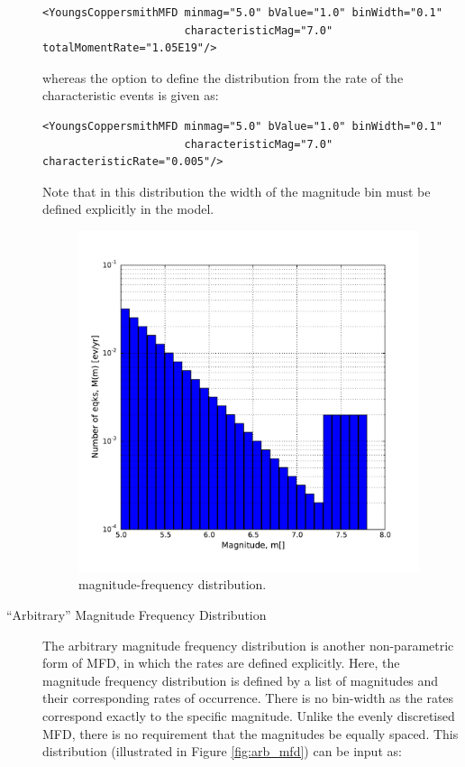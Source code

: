 \begin{description}
\begin{verbatim}
<YoungsCoppersmithMFD minmag="5.0" bValue="1.0" binWidth="0.1"
                      characteristicMag="7.0" totalMomentRate="1.05E19"/>
\end{verbatim}


\noindent whereas the option to define the distribution from the rate of
the characteristic events is given as:

\begin{verbatim}
<YoungsCoppersmithMFD minmag="5.0" bValue="1.0" binWidth="0.1"
                      characteristicMag="7.0" characteristicRate="0.005"/>
\end{verbatim}

Note that in this distribution the width of the magnitude bin must be defined
explicitly in the model.

\begin{figure}[!ht]
\centering
\includegraphics[width=10cm]{figures/hazard/yc_mfd_char_rate.pdf}
\caption{\cite{youngs1985} magnitude-frequency distribution.}
\label{fig:yc_gr_mfd}
\end{figure}

\item[``Arbitrary'' Magnitude Frequency Distribution]
The arbitrary magnitude frequency distribution is another non-parametric form
of MFD, in which the rates are defined explicitly. Here, the magnitude
frequency distribution is defined by a list of magnitudes and their
corresponding rates of occurrence. There is no bin-width as the rates
correspond exactly to the specific magnitude. Unlike the evenly discretised
MFD, there is no requirement that the magnitudes be equally spaced. This
distribution (illustrated in Figure \ref{fig:arb_mfd}) can be input as:


\end{description}
